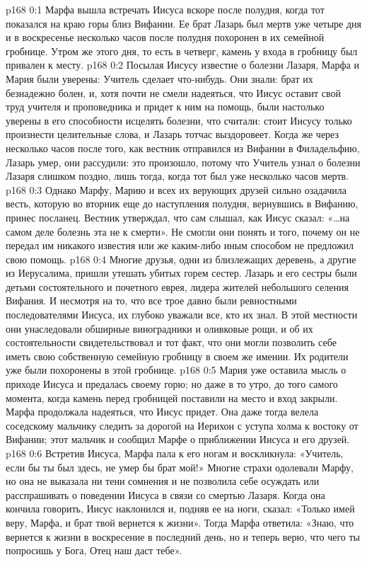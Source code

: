 \vs p168 0:1 Марфа вышла встречать Иисуса вскоре после полудня, когда тот показался на краю горы близ Вифании. Ее брат Лазарь был мертв уже четыре дня и в воскресенье несколько часов после полудня похоронен в их семейной гробнице. Утром же этого дня, то есть в четверг, камень у входа в гробницу был привален к месту.
\vs p168 0:2 Посылая Иисусу известие о болезни Лазаря, Марфа и Мария были уверены: Учитель сделает что\hyp{}нибудь. Они знали: брат их безнадежно болен, и, хотя почти не смели надеяться, что Иисус оставит свой труд учителя и проповедника и придет к ним на помощь, были настолько уверены в его способности исцелять болезни, что считали: стоит Иисусу только произнести целительные слова, и Лазарь тотчас выздоровеет. Когда же через несколько часов после того, как вестник отправился из Вифании в Филадельфию, Лазарь умер, они рассудили: это произошло, потому что Учитель узнал о болезни Лазаря слишком поздно, лишь тогда, когда тот был уже несколько часов мертв.
\vs p168 0:3 Однако Марфу, Марию и всех их верующих друзей сильно озадачила весть, которую во вторник еще до наступления полудня, вернувшись в Вифанию, принес посланец. Вестник утверждал, что сам слышал, как Иисус сказал: «\ldots на самом деле болезнь эта не к смерти». Не смогли они понять и того, почему он не передал им никакого известия или же каким\hyp{}либо иным способом не предложил свою помощь.
\vs p168 0:4 Многие друзья, одни из близлежащих деревень, а другие из Иерусалима, пришли утешать убитых горем сестер. Лазарь и его сестры были детьми состоятельного и почетного еврея, лидера жителей небольшого селения Вифания. И несмотря на то, что все трое давно были ревностными последователями Иисуса, их глубоко уважали все, кто их знал. В этой местности они унаследовали обширные виноградники и оливковые рощи, и об их состоятельности свидетельствовал и тот факт, что они могли позволить себе иметь свою собственную семейную гробницу в своем же имении. Их родители уже были похоронены в этой гробнице.
\vs p168 0:5 Мария уже оставила мысль о приходе Иисуса и предалась своему горю; но даже в то утро, до того самого момента, когда камень перед гробницей поставили на место и вход закрыли. Марфа продолжала надеяться, что Иисус придет. Она даже тогда велела соседскому мальчику следить за дорогой на Иерихон с уступа холма к востоку от Вифании; этот мальчик и сообщил Марфе о приближении Иисуса и его друзей.
\vs p168 0:6 Встретив Иисуса, Марфа пала к его ногам и воскликнула: «Учитель, если бы ты был здесь, не умер бы брат мой!» Многие страхи одолевали Марфу, но она не выказала ни тени сомнения и не позволила себе осуждать или расспрашивать о поведении Иисуса в связи со смертью Лазаря. Когда она кончила говорить, Иисус наклонился и, подняв ее на ноги, сказал: «Только имей веру, Марфа, и брат твой вернется к жизни». Тогда Марфа ответила: «Знаю, что вернется к жизни в воскресение в последний день, но и теперь верю, что чего ты попросишь у Бога, Отец наш даст тебе».
